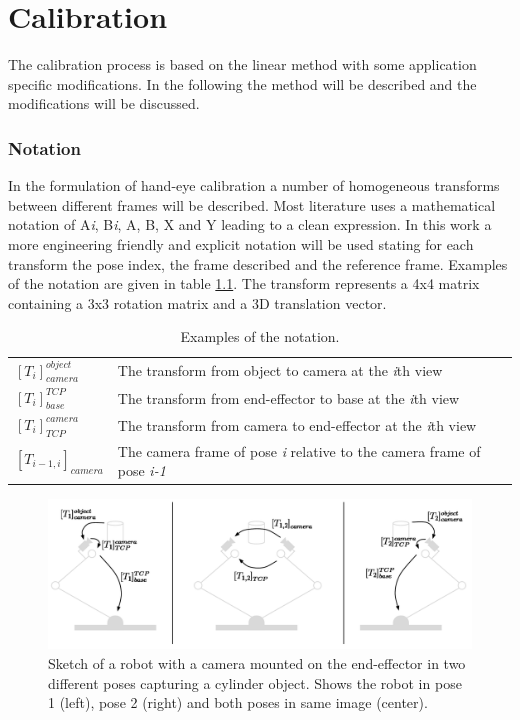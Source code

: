 \chapter{Calibration}
The calibration process is based on the linear method \cite{Tsai1988} with some application specific modifications. In the following the method will be described and the modifications will be discussed. 


\subsection{Notation}
In the formulation of hand-eye calibration a number of homogeneous transforms between different frames will be described. Most literature uses a mathematical notation of A\textit{i}, B\textit{i}, A, B, X and Y leading to a clean expression. In this work a more engineering friendly and explicit notation will be used stating for each transform the pose index, the frame described and the reference frame. Examples of the notation are given in table \ref{tab:notation}. The transform represents a 4x4 matrix containing a 3x3 rotation matrix and a 3D translation vector. \\

\begin{table}[h]
\caption{Examples of the notation.}
\begin{tabular}{ll}
\label{tab:notation}
$[T_{i}]_{camera}^{object}$   & The transform from object to camera at the \textit{i}th view           \\[8pt] 
$[T_{i}]_{base}^{TCP}$        & The transform from end-effector to base at the \textit{i}th view       \\[8pt] 
$[T_{i}]_{TCP}^{camera}$      & The transform from camera to end-effector at the \textit{i}th view     \\[8pt] 
$[T_{i-1,i}]_{camera}$        & The camera frame of pose \textit{i} relative to the camera frame of pose \textit{i-1}  \\[8pt]              
\end{tabular}
\end{table}

\begin{figure}[htb]
	\begin{center}
		\includegraphics[width=\textwidth,trim=0 0 0 0]{graphics/03_calibration/hand_eye_transforms.pdf}%
		\caption{Sketch of a robot with a camera mounted on the end-effector in two different poses capturing a cylinder object. Shows the robot in pose 1 (left), pose 2 (right) and both poses in same image (center).}\label{fig:hand_eye_transforms}
		
	\end{center}
\end{figure}

